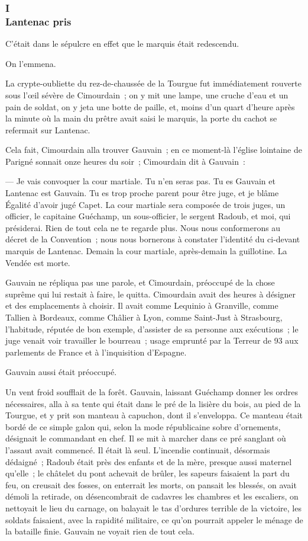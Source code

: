 \documentclass[french,twoside]{book} %
\begin{document}
\subsubsection[{I. Lantenac pris}]{I \\
Lantenac pris}
\label{p3l6c1}
\noindent C’était dans le sépulcre en effet que le marquis était redescendu.\par
On l’emmena.\par
La crypte-oubliette du rez-de-chaussée de la Tourgue fut immédiatement rouverte sous l’œil sévère de Cimourdain ; on y mit une lampe, une cruche d’eau et un pain de soldat, on y jeta une botte de paille, et, moins d’un quart d’heure après la minute où la main du prêtre avait saisi le marquis, la porte du cachot se refermait sur Lantenac.\par
Cela fait, Cimourdain alla trouver Gauvain ; en ce moment-là l’église lointaine de Parigné sonnait onze heures du soir ; Cimourdain dit à Gauvain :\par
 — Je vais convoquer la cour martiale. Tu n’en seras pas. Tu es Gauvain et Lantenac est Gauvain. Tu es trop proche parent pour être juge, et je blâme Égalité d’avoir jugé Capet. La cour martiale sera composée de trois juges, un officier, le capitaine Guéchamp, un sous-officier, le sergent Radoub, et moi, qui présiderai. Rien de tout cela ne te regarde plus. Nous nous conformerons au décret de la Convention ; nous nous bornerons à constater l’identité du ci-devant marquis de Lantenac. Demain la cour martiale, après-demain la guillotine. La Vendée est morte.\par
Gauvain ne répliqua pas une parole, et Cimourdain, préoccupé de la chose suprême qui lui restait à faire, le quitta. Cimourdain avait des heures à désigner et des emplacements à choisir. Il avait comme Lequinio à Granville, comme Tallien à Bordeaux, comme Châlier à Lyon, comme Saint-Just à Strasbourg, l’habitude, réputée de bon exemple, d’assister de sa personne aux exécutions ; le juge venait voir travailler le bourreau ; usage emprunté par la Terreur de 93 aux parlements de France et à l’inquisition d’Espagne.\par
Gauvain aussi était préoccupé.\par
Un vent froid soufflait de la forêt. Gauvain, laissant Guéchamp donner les ordres nécessaires, alla à sa tente qui était dans le pré de la lisière du bois, au pied de la Tourgue, et y prit son manteau à capuchon, dont il s’enveloppa. Ce manteau était bordé de ce simple galon qui, selon la mode républicaine sobre d’ornements, désignait le commandant en chef. Il se mit à marcher dans ce pré sanglant où l’assaut avait  commencé. Il était là seul. L’incendie continuait, désormais dédaigné ; Radoub était près des enfants et de la mère, presque aussi maternel qu’elle ; le châtelet du pont achevait de brûler, les sapeurs faisaient la part du feu, on creusait des fosses, on enterrait les morts, on pansait les blessés, on avait démoli la retirade, on désencombrait de cadavres les chambres et les escaliers, on nettoyait le lieu du carnage, on balayait le tas d’ordures terrible de la victoire, les soldats faisaient, avec la rapidité militaire, ce qu’on pourrait appeler le ménage de la bataille finie. Gauvain ne voyait rien de tout cela.\par
\end{document}
